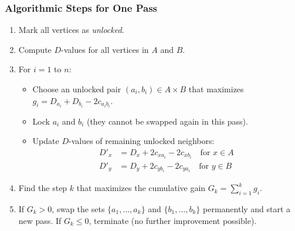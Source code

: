 \documentclass[12pt,a4paper]{article}
\begin{document}
\subsubsection{Algorithmic Steps for One Pass}
\begin{enumerate}[leftmargin=*, itemsep=2pt]
  \item Mark all vertices as \textit{unlocked}.
  \item Compute $D$-values for all vertices in $A$ and $B$.
  \item For $i = 1$ to $n$:
    \begin{itemize}[leftmargin=*, label=$\bullet$, itemsep=1.5pt]
      \item Choose an unlocked pair $(a_i, b_i) \in A \times B$ that maximizes $g_i = D_{a_i} + D_{b_i} - 2c_{a_i b_i}$.
      \item Lock $a_i$ and $b_i$ (they cannot be swapped again in this pass).
      \item Update $D$-values of remaining unlocked neighbors:
            \begin{align*}
              D'_x &= D_x + 2c_{x a_i} - 2c_{x b_i} \quad \text{for } x \in A \\
              D'_y &= D_y + 2c_{y b_i} - 2c_{y a_i} \quad \text{for } y \in B
            \end{align*}
    \end{itemize}
  \item Find the step $k$ that maximizes the cumulative gain $G_k = \sum_{i=1}^{k} g_i$.
  \item If $G_k > 0$, swap the sets $\{a_1, \ldots, a_k\}$ and $\{b_1, \ldots, b_k\}$ permanently and start a new pass. If $G_k \le 0$, terminate (no further improvement possible).
\end{enumerate}
\end{document}
